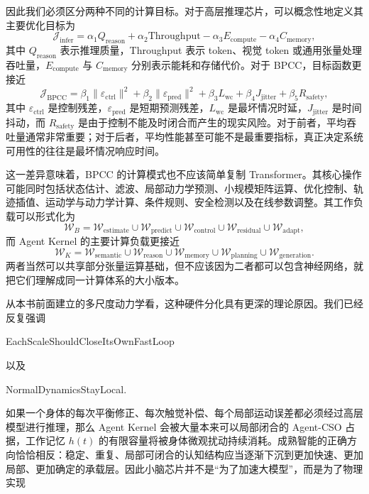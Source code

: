 因此我们必须区分两种不同的计算目标。对于高层推理芯片，可以概念性地定义其主要优化目标为
\[
\mathcal J_{\mathrm{infer}}
=
\alpha_1 Q_{\mathrm{reason}}
+
\alpha_2 \mathrm{Throughput}
-
\alpha_3 E_{\mathrm{compute}}
-
\alpha_4 C_{\mathrm{memory}},
\]
其中 $Q_{\mathrm{reason}}$ 表示推理质量，Throughput 表示 token、视觉 token 或通用张量处理吞吐量，$E_{\mathrm{compute}}$ 与 $C_{\mathrm{memory}}$ 分别表示能耗和存储代价。对于 BPCC，目标函数更接近
\[
\mathcal J_{\mathrm{BPCC}}
=
\beta_1 \|\varepsilon_{\mathrm{ctrl}}\|^2
+
\beta_2 \|\varepsilon_{\mathrm{pred}}\|^2
+
\beta_3 L_{\mathrm{wc}}
+
\beta_4 J_{\mathrm{jitter}}
+
\beta_5 R_{\mathrm{safety}},
\]
其中 $\varepsilon_{\mathrm{ctrl}}$ 是控制残差，$\varepsilon_{\mathrm{pred}}$ 是短期预测残差，$L_{\mathrm{wc}}$ 是最坏情况时延，$J_{\mathrm{jitter}}$ 是时间抖动，而 $R_{\mathrm{safety}}$ 是由于控制不能及时闭合而产生的现实风险。对于前者，平均吞吐量通常非常重要；对于后者，平均性能甚至可能不是最重要指标，真正决定系统可用性的往往是最坏情况响应时间。

这一差异意味着，BPCC 的计算模式也不应该简单复制 Transformer。其核心操作可能同时包括状态估计、滤波、局部动力学预测、小规模矩阵运算、优化控制、轨迹插值、运动学与动力学计算、条件规则、安全检测以及在线参数调整。其工作负载可以形式化为
\[
\mathcal W_B
=
\mathcal W_{\mathrm{estimate}}
\cup
\mathcal W_{\mathrm{predict}}
\cup
\mathcal W_{\mathrm{control}}
\cup
\mathcal W_{\mathrm{residual}}
\cup
\mathcal W_{\mathrm{adapt}},
\]
而 Agent Kernel 的主要计算负载更接近
\[
\mathcal W_K
=
\mathcal W_{\mathrm{semantic}}
\cup
\mathcal W_{\mathrm{reason}}
\cup
\mathcal W_{\mathrm{memory}}
\cup
\mathcal W_{\mathrm{planning}}
\cup
\mathcal W_{\mathrm{generation}}.
\]
两者当然可以共享部分张量运算基础，但不应该因为二者都可以包含神经网络，就把它们理解成同一计算体系的大小版本。

从本书前面建立的多尺度动力学看，这种硬件分化具有更深的理论原因。我们已经反复强调
\begin{statementbox}
EachScaleShouldCloseItsOwnFastLoop
\end{statementbox}
以及
\begin{statementbox}
NormalDynamicsStayLocal.
\end{statementbox}
如果一个身体的每次平衡修正、每次触觉补偿、每个局部运动误差都必须经过高层模型进行推理，那么 Agent Kernel 会被大量本来可以局部闭合的 Agent-CSO 占据，工作记忆 $h(t)$ 的有限容量将被身体微观扰动持续消耗。成熟智能的正确方向恰恰相反：稳定、重复、局部可闭合的认知结构应当逐渐下沉到更加快速、更加局部、更加确定的承载层。因此小脑芯片并不是“为了加速大模型”，而是为了物理实现
\begin{statementbox}
\centering
{}
\end{statementbox}

